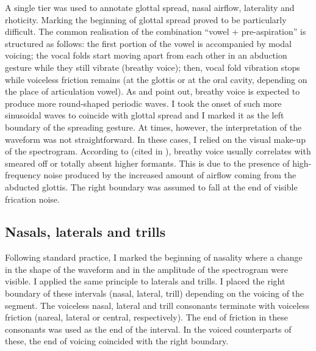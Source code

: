 \documentclass[11pt,a4paper,openany]{memoir}\usepackage[]{graphicx}\usepackage[]{color}
\begin{document}
A single tier was used to annotate glottal spread, nasal airflow, laterality and rhoticity.
Marking the beginning of glottal spread proved to be particularly difficult.
The common realisation of the combination ``vowel + pre-aspiration'' is structured as follows: the first portion of the vowel is accompanied by modal voicing; the vocal folds start moving apart from each other in an abduction gesture while they still vibrate (breathy voice); then, vocal fold vibration stops while voiceless friction remains (at the glottis or at the oral cavity, depending on the place of articulation vowel).
As \citet{khan2012} and \citet{nance2013} point out, breathy voice is expected to produce more round-shaped periodic waves.
I took the onset of such more sinusoidal waves to coincide with glottal spread and I marked it as the left boundary of the spreading gesture.
At times, however, the interpretation of the waveform was not straightforward.
In these cases, I relied on the visual make-up of the spectrogram.
According to \citealt{jones2006} (cited in \citealt[134]{nance2013}), breathy voice usually correlates with smeared off or totally absent higher formants.
This is due to the presence of high-frequency noise produced by the increased amount of airflow coming from the abducted glottis.
The right boundary was assumed to fall at the end of visible frication noise.

\subsection{Nasals, laterals and trills}

Following standard practice, I marked the beginning of nasality where a change in the shape of the waveform and in the amplitude of the spectrogram were visible.
I applied the same principle to laterals and trills.
I placed the right boundary of these intervals (nasal, lateral, trill) depending on the voicing of the segment.
The voiceless nasal, lateral and trill consonants terminate with voiceless friction (nareal, lateral or central, respectively).
The end of friction in these consonants was used as the end of the interval.
In the voiced counterparts of these, the end of voicing coincided with the right boundary.
\end{document}
